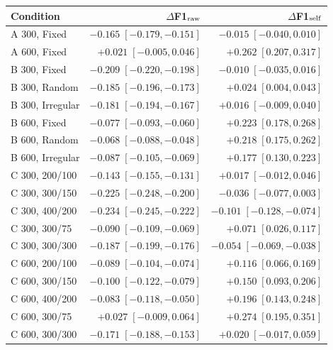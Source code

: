 \begin{tabular}{lrr}
\toprule
Condition & $\Delta$F1$_{\rm raw}$ & $\Delta$F1$_{\rm self}$ \\
\midrule
A 300, Fixed & $-0.165\;[-0.179,-0.151]$ & $-0.015\;[-0.040,0.010]$ \\
A 600, Fixed & $+0.021\;[-0.005,0.046]$ & $+0.262\;[0.207,0.317]$ \\
B 300, Fixed & $-0.209\;[-0.220,-0.198]$ & $-0.010\;[-0.035,0.016]$ \\
B 300, Random & $-0.185\;[-0.196,-0.173]$ & $+0.024\;[0.004,0.043]$ \\
B 300, Irregular & $-0.181\;[-0.194,-0.167]$ & $+0.016\;[-0.009,0.040]$ \\
B 600, Fixed & $-0.077\;[-0.093,-0.060]$ & $+0.223\;[0.178,0.268]$ \\
B 600, Random & $-0.068\;[-0.088,-0.048]$ & $+0.218\;[0.175,0.262]$ \\
B 600, Irregular & $-0.087\;[-0.105,-0.069]$ & $+0.177\;[0.130,0.223]$ \\
C 300, 200/100 & $-0.143\;[-0.155,-0.131]$ & $+0.017\;[-0.012,0.046]$ \\
C 300, 300/150 & $-0.225\;[-0.248,-0.200]$ & $-0.036\;[-0.077,0.003]$ \\
C 300, 400/200 & $-0.234\;[-0.245,-0.222]$ & $-0.101\;[-0.128,-0.074]$ \\
C 300, 300/75 & $-0.090\;[-0.109,-0.069]$ & $+0.071\;[0.026,0.117]$ \\
C 300, 300/300 & $-0.187\;[-0.199,-0.176]$ & $-0.054\;[-0.069,-0.038]$ \\
C 600, 200/100 & $-0.089\;[-0.104,-0.074]$ & $+0.116\;[0.066,0.169]$ \\
C 600, 300/150 & $-0.100\;[-0.122,-0.079]$ & $+0.150\;[0.093,0.206]$ \\
C 600, 400/200 & $-0.083\;[-0.118,-0.050]$ & $+0.196\;[0.143,0.248]$ \\
C 600, 300/75 & $+0.027\;[-0.009,0.064]$ & $+0.274\;[0.195,0.351]$ \\
C 600, 300/300 & $-0.171\;[-0.188,-0.153]$ & $+0.020\;[-0.017,0.059]$ \\
\bottomrule
\end{tabular}
